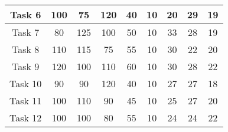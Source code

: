 \begin{table}[h]
\begin{minipage}{3.5in}
\begin{tabular}{|c|c|c|c|c|c|c|c|c|}
            Task 6  & 100   & 75    & 120   & 40    & 10    & 20        & 29        & 19        \\ \hline
            Task 7  & 80    & 125   & 100   & 50    & 10    & 33        & 28        & 19        \\ \hline
            Task 8  & 110   & 115   & 75    & 55    & 10    & 30        & 22        & 20        \\ \hline
            Task 9  & 120   & 100   & 110   & 60    & 10    & 30        & 28        & 22        \\ \hline
            Task 10 & 90    & 90    & 120   & 40    & 10    & 27        & 27        & 18        \\ \hline
            Task 11 & 100   & 110   & 90    & 45    & 10    & 25        & 27        & 20        \\ \hline
            Task 12 & 100   & 100   & 80    & 55    & 10    & 24        & 24        & 22        \\ \hline
        \end{tabular}
    \end{minipage}
    \label{tab:example-tasks-server-properties}
\end{table}

